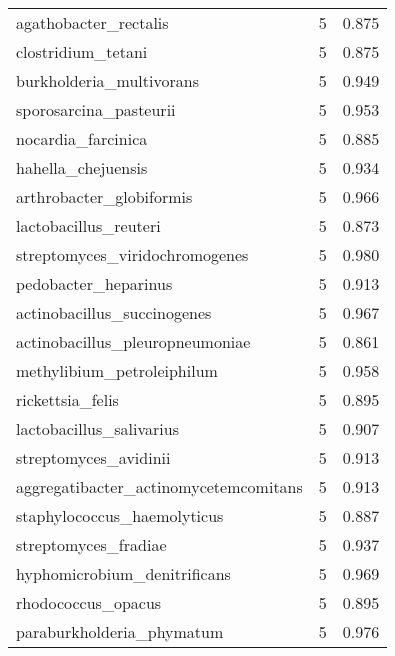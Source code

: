 \begin{tabular}{lrr}
                       agathobacter\_rectalis &                   5 &     0.875 \\
                          clostridium\_tetani &                   5 &     0.875 \\
                    burkholderia\_multivorans &                   5 &     0.949 \\
                      sporosarcina\_pasteurii &                   5 &     0.953 \\
                          nocardia\_farcinica &                   5 &     0.885 \\
                          hahella\_chejuensis &                   5 &     0.934 \\
                    arthrobacter\_globiformis &                   5 &     0.966 \\
                       lactobacillus\_reuteri &                   5 &     0.873 \\
              streptomyces\_viridochromogenes &                   5 &     0.980 \\
                        pedobacter\_heparinus &                   5 &     0.913 \\
                 actinobacillus\_succinogenes &                   5 &     0.967 \\
             actinobacillus\_pleuropneumoniae &                   5 &     0.861 \\
                  methylibium\_petroleiphilum &                   5 &     0.958 \\
                            rickettsia\_felis &                   5 &     0.895 \\
                    lactobacillus\_salivarius &                   5 &     0.907 \\
                       streptomyces\_avidinii &                   5 &     0.913 \\
       aggregatibacter\_actinomycetemcomitans &                   5 &     0.913 \\
                 staphylococcus\_haemolyticus &                   5 &     0.887 \\
                        streptomyces\_fradiae &                   5 &     0.937 \\
                hyphomicrobium\_denitrificans &                   5 &     0.969 \\
                          rhodococcus\_opacus &                   5 &     0.895 \\
                   paraburkholderia\_phymatum &                   5 &     0.976 \\

\end{tabular}
